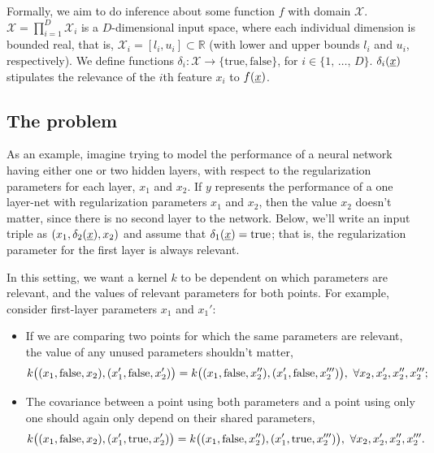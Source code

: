 \documentclass{article}
\newcommand{\vect}[1]{\underline{\smash{#1}}}
\renewcommand{\v}[1]{\vect{#1}}
\newcommand{\reals}{\mathds{R}}
\newcommand{\sX}{\mathcal{X}}
\begin{document}
Formally, we aim to do inference about some function $f$ with domain 
 $\sX$. $\sX = \prod_{i=1}^D \sX_i$ is a $D$-dimensional input space, where each individual dimension is bounded real, that is, $\sX_i = [l_i, u_i] \subset \reals$ (with lower and upper bounds $l_i$ and $u_i$, respectively). We define functions $\delta_i\colon \sX\to \{\text{true}, \text{false}\}$, for $i \in \{1,\,\ldots,\,D\}$. $\delta_i(\v{x})$ stipulates the relevance of the $i$th feature $x_i$ to 
  $f(\v{x})$.



\subsection{The problem}
\vspace{-0.05in}

As an example, imagine trying to model the performance of a neural network having either one or two hidden layers, with respect to the regularization parameters for each layer, $x_1$ and $x_2$.  If $y$ represents the performance of a one layer-net with regularization parameters $x_1$ and $x_2$, then the value $x_2$ doesn't matter, since there is no second layer to the network. Below, we'll write an input triple as $(x_1, \delta_2(\v{x}), x_2)$ and assume that $\delta_1(\v{x}) = \text{true}$; that is, the regularization parameter for the first layer is always relevant. 

In this setting, we want a kernel $k$ to be dependent on which parameters are relevant, and the values of relevant parameters for both points. For example, consider first-layer parameters $x_1$ and $x_1'$:
%
\begin{itemize}[leftmargin=0.8cm]
\item If we are comparing two points for which the same parameters are relevant, the value of any unused parameters shouldn't matter,  
\begin{equation}
 k\bigl((x_1, \textnormal{false}, x_2), (x_1', \textnormal{false}, x_2') \bigr)
= k\bigl((x_1, \textnormal{false}, x_2''), (x_1', \textnormal{false}, x_2''')\bigr),\ 
\forall x_2, x_2', x_2'', x_2''';
\end{equation}
\item The covariance between a point using both parameters and a point using only one should again only depend on their shared parameters,
\begin{equation}
 k\bigl((x_1, \textnormal{false}, x_2), (x_1', \textnormal{true}, x_2') \bigr)
= k\bigl((x_1, \textnormal{false}, x_2''), (x_1', \textnormal{true}, x_2''')\bigr),\ 
\forall x_2, x_2', x_2'', x_2'''.
\end{equation}
\end{itemize}
\end{document}
